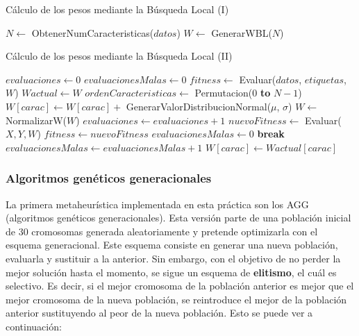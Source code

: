 \documentclass[11pt,a4paper]{article}
\begin{document}
\begin{algorithm}[H]
\label{alg:local-search}
\caption{Cálculo de los pesos mediante la Búsqueda Local (I)}
\begin{algorithmic}[1]
\State $N \gets $ ObtenerNumCaracteristicas($datos$)
\State $W \gets$ GenerarWBL($N$)
\end{algorithmic}
\end{algorithm}

\begin{algorithm}[H]
\caption{Cálculo de los pesos mediante la Búsqueda Local (II)}
\begin{algorithmic}
\State $evaluaciones \gets 0$
\State $evaluacionesMalas \gets 0$
\State $fitness \gets$ Evaluar($datos$, $etiquetas$, $W$)
\State $Wactual \gets W$
\State $ordenCaracteristicas \gets $ Permutacion(0 \textbf{to} $N - 1$)
	\State $W[carac] \gets W[carac] + $ GenerarValorDistribucionNormal($\mu$, $\sigma$)	
	\State $W \gets$ NormalizarW($W$)
	\State $evaluaciones \gets evaluaciones + 1$	
	\State $nuevoFitness \gets$ Evaluar($X, Y, W$)	
		\State $fitness \gets nuevoFitness$		
		\State $evaluacionesMalas \gets 0$		
		\State \textbf{break}
	\Else
		\State $evaluacionesMalas \gets evaluacionesMalas + 1$		
		\State $W[carac] \gets Wactual[carac]$		
	\EndIf	
		\State {}
	\EndIf
\EndFor
\EndWhile
\State {}
\EndFunction
\end{algorithmic}
\end{algorithm}

\newpage

\subsubsection{Algoritmos genéticos generacionales}

La primera metaheurística implementada en esta práctica son los AGG (algoritmos genéticos generacionales). Esta versión parte
de una población inicial de 30 cromosomas generada aleatoriamente y pretende optimizarla con el esquema generacional. Este
esquema consiste en generar una nueva población, evaluarla y sustituir a la anterior. Sin embargo, con el objetivo de no perder
la mejor solución hasta el momento, se sigue un esquema de \textbf{elitismo}, el cuál es selectivo. Es decir, si el mejor
cromosoma de la población anterior es mejor que el mejor cromosoma de la nueva población, se reintroduce el mejor de la
población anterior sustituyendo al peor de la nueva población. Esto se puede ver a continuación:
\end{document}
